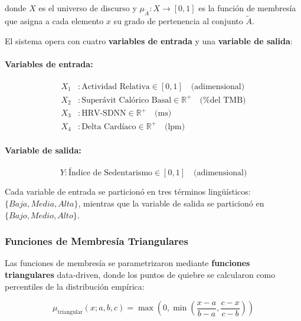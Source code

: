 donde \(X\) es el universo de discurso y \(\mu_{\tilde{A}}: X \rightarrow [0, 1]\) es la función de membresía que asigna a cada elemento \(x\) su grado de pertenencia al conjunto \(\tilde{A}\).

El sistema opera con cuatro \textbf{variables de entrada} y una \textbf{variable de salida}:

\paragraph{Variables de entrada:}
\begin{align}
X_1 &: \text{Actividad Relativa} \in [0, 1] \quad \text{(adimensional)} \label{eq:var_actividad} \\
X_2 &: \text{Superávit Calórico Basal} \in \mathbb{R}^+ \quad \text{(\% del TMB)} \label{eq:var_superavit} \\
X_3 &: \text{HRV-SDNN} \in \mathbb{R}^+ \quad \text{(ms)} \label{eq:var_hrv} \\
X_4 &: \text{Delta Cardíaco} \in \mathbb{R}^+ \quad \text{(lpm)} \label{eq:var_delta}
\end{align}

\paragraph{Variable de salida:}
\begin{equation}
Y: \text{Índice de Sedentarismo} \in [0, 1] \quad \text{(adimensional)}
\label{eq:var_salida}
\end{equation}

Cada variable de entrada se particionó en tres términos lingüísticos: \(\{Baja, Media, Alta\}\), mientras que la variable de salida se particionó en \(\{Bajo, Medio, Alto\}\).

\subsubsection{Funciones de Membresía Triangulares}
\label{subsubsec:funciones_membresia}

Las funciones de membresía se parametrizaron mediante \textbf{funciones triangulares} data-driven, donde los puntos de quiebre se calcularon como percentiles de la distribución empírica:

\begin{equation}
\mu_{\text{triangular}}(x; a, b, c) = \max\left(0, \min\left(\frac{x - a}{b - a}, \frac{c - x}{c - b}\right)\right)
\label{eq:func_triangular}
\end{equation}

